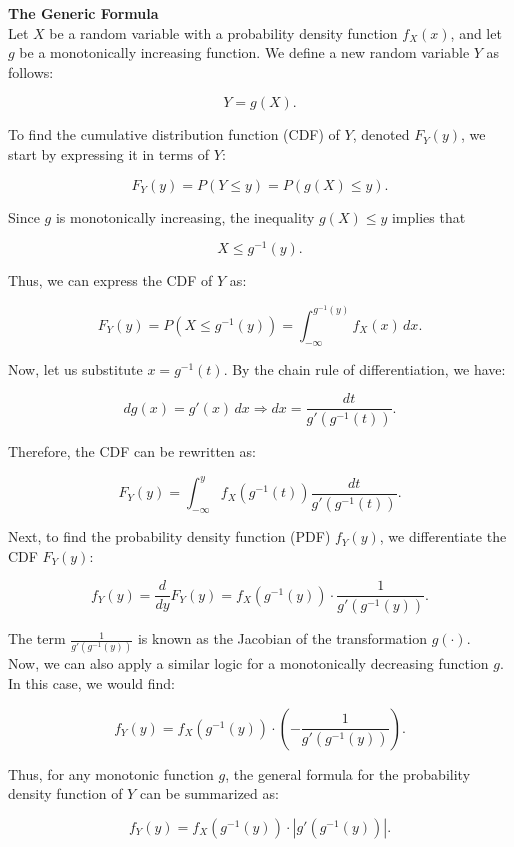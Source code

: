 \textbf{The Generic Formula} \\

Let \( X \) be a random variable with a probability density function \( f_X(x) \), and let \( g \) be a monotonically increasing function. We define a new random variable \( Y \) as follows:

\[
Y = g(X).
\]

To find the cumulative distribution function (CDF) of \( Y \), denoted \( F_Y(y) \), we start by expressing it in terms of \( Y \):

\[
F_Y(y) = P(Y \leq y) = P(g(X) \leq y).
\]

Since \( g \) is monotonically increasing, the inequality \( g(X) \leq y \) implies that 

\[
X \leq g^{-1}(y).
\]

Thus, we can express the CDF of \( Y \) as:

\[
F_Y(y) = P(X \leq g^{-1}(y)) = \int_{-\infty}^{g^{-1}(y)} f_X(x) \, dx.
\]

Now, let us substitute \( x = g^{-1}(t) \). By the chain rule of differentiation, we have:

\[
dg(x) = g'(x) \, dx \Rightarrow dx = \frac{dt}{g'(g^{-1}(t))}.
\]

Therefore, the CDF can be rewritten as:

\[
F_Y(y) = \int_{-\infty}^{y} f_X(g^{-1}(t)) \frac{dt}{g'(g^{-1}(t))}.
\]

Next, to find the probability density function (PDF) \( f_Y(y) \), we differentiate the CDF \( F_Y(y) \):

\[
f_Y(y) = \frac{d}{dy} F_Y(y) = f_X(g^{-1}(y)) \cdot \frac{1}{g'(g^{-1}(y))}.
\]

The term \( \frac{1}{g'(g^{-1}(y))} \) is known as the Jacobian of the transformation \( g(\cdot) \). \\

Now, we can also apply a similar logic for a monotonically decreasing function \( g \). In this case, we would find:

\[
f_Y(y) = f_X(g^{-1}(y)) \cdot \left(-\frac{1}{g'(g^{-1}(y))}\right).
\]

Thus, for any monotonic function \( g \), the general formula for the probability density function of \( Y \) can be summarized as:

\[
f_Y(y) = f_X(g^{-1}(y)) \cdot |g'(g^{-1}(y))|.
\]

